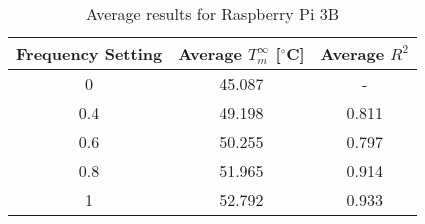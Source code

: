 \begin{table}[H]
 \centering
 \caption[Thermal Profile Raspberry Pi]{Average results for Raspberry Pi 3B}\label{tab:t_tp_pi}
 \begin{tabular}{||c | c | c||} 
 \hline
 Frequency Setting & Average $T^\infty_m$ [$^{\circ}$C] & Average $R^2$ \\ [0.5ex] 
 \hline\hline
 0 & 45.087 & - \\
 \hline
 0.4 & 49.198 & 0.811 \\
 \hline
 0.6 & 50.255 & 0.797 \\
 \hline
 0.8 & 51.965 & 0.914 \\
 \hline
 1 & 52.792 & 0.933 \\
 \hline
\end{tabular}
\end{table}